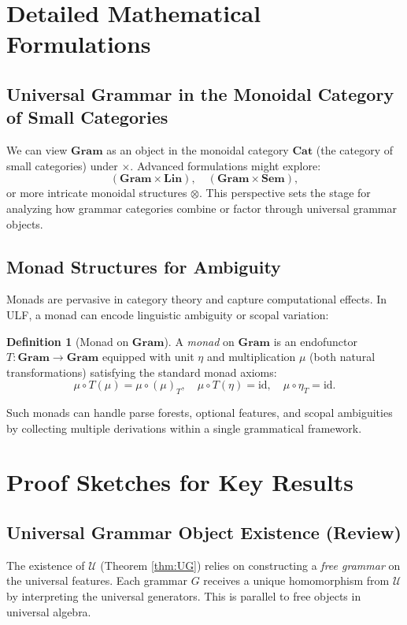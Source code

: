 \documentclass[12pt]{article}
\theoremstyle{plain}
\theoremstyle{definition}
\newtheorem{definition}[theorem]{Definition}
\begin{document}
\section{Detailed Mathematical Formulations}

\subsection{Universal Grammar in the Monoidal Category of Small Categories}
We can view \(\mathbf{Gram}\) as an object in the monoidal category \(\mathbf{Cat}\) (the category of small categories) under \(\times\). Advanced formulations might explore:
\[
(\mathbf{Gram} \times \mathbf{Lin}), \quad (\mathbf{Gram} \times \mathbf{Sem}),
\]
or more intricate monoidal structures \(\otimes\). This perspective sets the stage for analyzing how grammar categories combine or factor through universal grammar objects.

\subsection{Monad Structures for Ambiguity}
Monads are pervasive in category theory and capture computational effects. In ULF, a monad can encode linguistic ambiguity or scopal variation:

\begin{definition}[Monad on \(\mathbf{Gram}\)]
A \emph{monad} on \(\mathbf{Gram}\) is an endofunctor \(T : \mathbf{Gram} \to \mathbf{Gram}\) equipped with unit \(\eta\) and multiplication \(\mu\) (both natural transformations) satisfying the standard monad axioms:
\[
\mu \circ T(\mu) = \mu \circ (\mu)_T, 
\quad
\mu \circ T(\eta) = \mathrm{id},
\quad
\mu \circ \eta_T = \mathrm{id}.
\]
\end{definition}

Such monads can handle parse forests, optional features, and scopal ambiguities by collecting multiple derivations within a single grammatical framework.

\section{Proof Sketches for Key Results}

\subsection{Universal Grammar Object Existence (Review)}
The existence of \(\mathcal{U}\) (Theorem \ref{thm:UG}) relies on constructing a \emph{free grammar} on the universal features. Each grammar \(G\) receives a unique homomorphism from \(\mathcal{U}\) by interpreting the universal generators. This is parallel to free objects in universal algebra.
\end{document}
